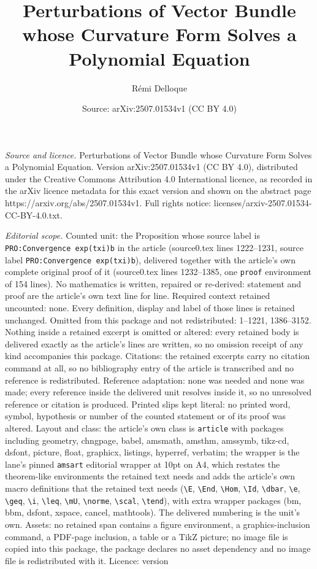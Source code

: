 \documentclass[10pt,a4paper]{amsart}
\title[Perturbations of Vector Bundle whose Curvature Form Solves a]{Perturbations of Vector Bundle whose Curvature Form Solves a Polynomial Equation}
\author{R\'emi Delloque}
\date{Source: arXiv:2507.01534v1 (CC BY 4.0)}
\begin{document}
\maketitle

\noindent\emph{Source and licence.} Perturbations of Vector Bundle whose Curvature Form Solves a Polynomial Equation. Version arXiv:2507.01534v1 (CC BY 4.0), distributed under the Creative Commons Attribution 4.0 International licence, as recorded in the arXiv licence metadata for this exact version and shown on the abstract page https://arxiv.org/abs/2507.01534v1. Full rights notice: licenses/arxiv-2507.01534-CC-BY-4.0.txt.\par\smallskip

\noindent\textit{Editorial scope.} Counted unit: the Proposition whose source label is \texttt{PRO:Convergence exp(txi)b} in the article (source0.tex lines 1222--1231, source label \texttt{PRO:Convergence exp(txi)b}), delivered together with the article's own complete original proof of it (source0.tex lines 1232--1385, one \texttt{proof} environment of 154 lines). No mathematics is written, repaired or re-derived: statement and proof are the article's own text line for line. Required context retained uncounted: none. Every definition, display and label of those lines is retained unchanged. Omitted from this package and not redistributed: 1--1221, 1386--3152. Nothing inside a retained excerpt is omitted or altered: every retained body is delivered exactly as the article's lines are written, so no omission receipt of any kind accompanies this package. Citations: the retained excerpts carry no citation command at all, so no bibliography entry of the article is transcribed and no reference is redistributed. Reference adaptation: none was needed and none was made; every reference inside the delivered unit resolves inside it, so no unresolved reference or citation is produced. Printed slips kept literal: no printed word, symbol, hypothesis or number of the counted statement or of its proof was altered. Layout and class: the article's own class is \texttt{article} with packages including geometry, chngpage, babel, amsmath, amsthm, amssymb, tikz-cd, dsfont, picture, float, graphicx, listings, hyperref, verbatim; the wrapper is the lane's pinned \texttt{amsart} editorial wrapper at 10pt on A4, which restates the theorem-like environments the retained text needs and adds the article's own macro definitions that the retained text needs (\texttt{\textbackslash E}, \texttt{\textbackslash End}, \texttt{\textbackslash Hom}, \texttt{\textbackslash Id}, \texttt{\textbackslash dbar}, \texttt{\textbackslash e}, \texttt{\textbackslash geq}, \texttt{\textbackslash i}, \texttt{\textbackslash leq}, \texttt{\textbackslash mU}, \texttt{\textbackslash norme}, \texttt{\textbackslash scal}, \texttt{\textbackslash tend}), with extra wrapper packages (bm, bbm, dsfont, xspace, cancel, mathtools). The delivered numbering is the unit's own. Assets: no retained span contains a figure environment, a graphics-inclusion command, a PDF-page inclusion, a table or a TikZ picture; no image file is copied into this package, the package declares no asset dependency and no image file is redistributed with it. Licence: version 
\end{document}
